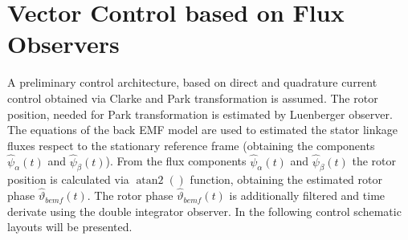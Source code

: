 \documentclass[11pt,a4paper,oneside]{book}
\numberwithin{equation}{section}
\DeclareMathOperator{\atantwo}{atan2}
\theoremstyle{it}
\theoremstyle{definition}
\begin{document}
\section{Vector Control based on Flux Observers}
A preliminary control architecture, based on direct and quadrature current control obtained via Clarke and Park transformation is assumed. The rotor position, needed for Park transformation is estimated by Luenberger observer. The equations of the back EMF model are used to estimated the stator linkage fluxes respect to the stationary reference frame (obtaining the components $\hat{\psi}_{\alpha}(t)$ and $\hat{\psi}_{\beta}(t)$). From the flux components $\hat{\psi}_{\alpha}(t)$ and $\hat{\psi}_{\beta}(t)$ the rotor position is calculated via $\atantwo()$ function, obtaining the estimated rotor phase $\hat{\vartheta}_{bemf}(t)$. The rotor phase $\hat{\vartheta}_{bemf}(t)$ is additionally filtered and time derivate using the double integrator observer. In the following control schematic layouts will be presented.
\end{document}
